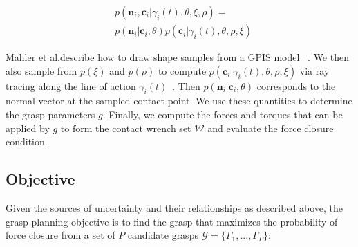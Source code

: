 \documentclass[a4paper, 10pt, conference]{ieeeconf}      %
\newcommand{\mG}{\mathcal{G}}
\newcommand{\mW}{\mathcal{W}}
\begin{document}
 \vspace{-2ex}
 \begin{align*}
 &p(\textbf{n}_i,\textbf{c}_i |\gamma_i(t),\theta,\xi,\rho)=\\
 &p(\textbf{n}_i|\textbf{c}_i,\theta)p(\textbf{c}_i|\gamma_i(t),\theta,\rho,\xi)
 \end{align*}

 
Mahler et al.describe how to draw shape samples from a GPIS model ~\cite{mahler2015gp}.
We then also sample from $p(\xi)$ and $p(\rho)$ to compute $p(\textbf{c}_i|\gamma_i(t),\theta,\rho,\xi)$ via ray tracing along the line of action $\gamma_i(t)$~\cite{newcombe2011kinectfusion}.
Then $p(\textbf{n}_i|\textbf{c}_i,\theta)$ corresponds to the normal vector at the sampled contact point.
We use these quantities to determine the grasp parameters $g$.
Finally, we compute the forces and torques that can be applied by $g$ to form the contact wrench set $\mW$ and evaluate the force closure condition.


%



\subsection{Objective}

Given the sources of uncertainty and their relationships as described above, the grasp planning objective is to find the grasp that maximizes the probability of force closure from a set of $P$ candidate grasps $\mG = \{\Gamma_1, ..., \Gamma_P\}$:
\end{document}
